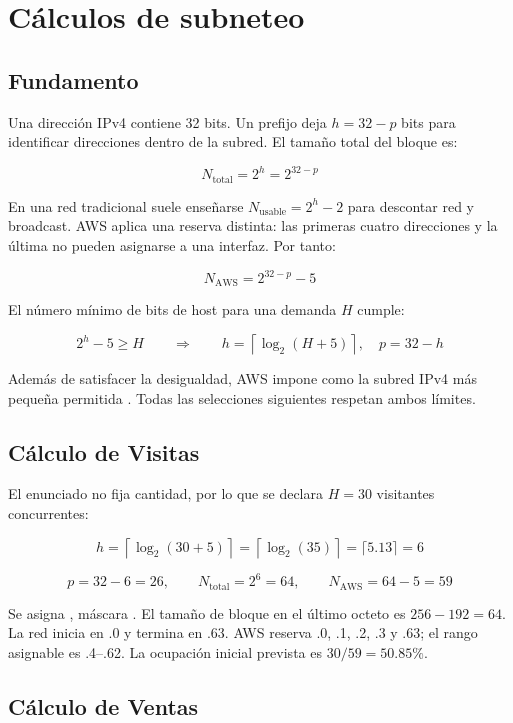 \chapter{Cálculos de subneteo}

\section{Fundamento}

Una dirección IPv4 contiene 32 bits. Un prefijo  deja $h=32-p$ bits para identificar direcciones dentro de la subred. El tamaño total del bloque es:

\[
N_{\mathrm{total}} = 2^h = 2^{32-p}
\]

En una red tradicional suele enseñarse $N_{\mathrm{usable}}=2^h-2$ para descontar red y broadcast. AWS aplica una reserva distinta: las primeras cuatro direcciones y la última no pueden asignarse a una interfaz. Por tanto:

\[
N_{\mathrm{AWS}} = 2^{32-p}-5
\]

El número mínimo de bits de host para una demanda $H$ cumple:

\[
2^h-5 \geq H
\qquad\Longrightarrow\qquad
h=\left\lceil\log_2(H+5)\right\rceil,
\quad p=32-h
\]

Además de satisfacer la desigualdad, AWS impone  como la subred IPv4 más pequeña permitida \cite{aws-subnet-sizing}. Todas las selecciones siguientes respetan ambos límites.

\section{Cálculo de Visitas}

El enunciado no fija cantidad, por lo que se declara $H=30$ visitantes concurrentes:

\[
h=\left\lceil\log_2(30+5)\right\rceil
=\left\lceil\log_2(35)\right\rceil
=\lceil5.13\rceil=6
\]

\[
p=32-6=26,\qquad
N_{\mathrm{total}}=2^6=64,\qquad
N_{\mathrm{AWS}}=64-5=59
\]

Se asigna , máscara . El tamaño de bloque en el último octeto es $256-192=64$. La red inicia en .0 y termina en .63. AWS reserva .0, .1, .2, .3 y .63; el rango asignable es .4--.62. La ocupación inicial prevista es $30/59=50.85\%$.

\section{Cálculo de Ventas}

